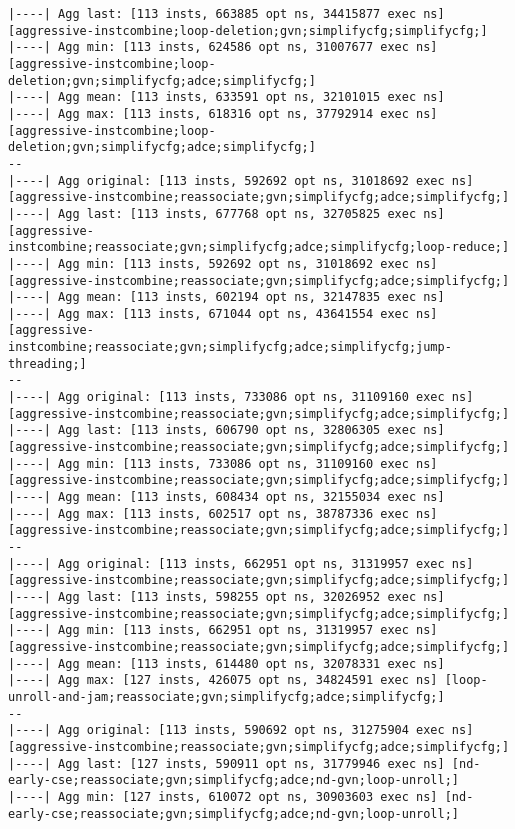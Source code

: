 \documentclass{vldb}
\begin{document}
\begin{lstlisting}[caption={Results of TPC-C Query with Expert Optimizations},label={lst:tpccexpertopt}]
|----| Agg last: [113 insts, 663885 opt ns, 34415877 exec ns] [aggressive-instcombine;loop-deletion;gvn;simplifycfg;simplifycfg;]
|----| Agg min: [113 insts, 624586 opt ns, 31007677 exec ns] [aggressive-instcombine;loop-deletion;gvn;simplifycfg;adce;simplifycfg;]
|----| Agg mean: [113 insts, 633591 opt ns, 32101015 exec ns]
|----| Agg max: [113 insts, 618316 opt ns, 37792914 exec ns] [aggressive-instcombine;loop-deletion;gvn;simplifycfg;adce;simplifycfg;]
--
|----| Agg original: [113 insts, 592692 opt ns, 31018692 exec ns] [aggressive-instcombine;reassociate;gvn;simplifycfg;adce;simplifycfg;]
|----| Agg last: [113 insts, 677768 opt ns, 32705825 exec ns] [aggressive-instcombine;reassociate;gvn;simplifycfg;adce;simplifycfg;loop-reduce;]
|----| Agg min: [113 insts, 592692 opt ns, 31018692 exec ns] [aggressive-instcombine;reassociate;gvn;simplifycfg;adce;simplifycfg;]
|----| Agg mean: [113 insts, 602194 opt ns, 32147835 exec ns]
|----| Agg max: [113 insts, 671044 opt ns, 43641554 exec ns] [aggressive-instcombine;reassociate;gvn;simplifycfg;adce;simplifycfg;jump-threading;]
--
|----| Agg original: [113 insts, 733086 opt ns, 31109160 exec ns] [aggressive-instcombine;reassociate;gvn;simplifycfg;adce;simplifycfg;]
|----| Agg last: [113 insts, 606790 opt ns, 32806305 exec ns] [aggressive-instcombine;reassociate;gvn;simplifycfg;adce;simplifycfg;]
|----| Agg min: [113 insts, 733086 opt ns, 31109160 exec ns] [aggressive-instcombine;reassociate;gvn;simplifycfg;adce;simplifycfg;]
|----| Agg mean: [113 insts, 608434 opt ns, 32155034 exec ns]
|----| Agg max: [113 insts, 602517 opt ns, 38787336 exec ns] [aggressive-instcombine;reassociate;gvn;simplifycfg;adce;simplifycfg;]
--
|----| Agg original: [113 insts, 662951 opt ns, 31319957 exec ns] [aggressive-instcombine;reassociate;gvn;simplifycfg;adce;simplifycfg;]
|----| Agg last: [113 insts, 598255 opt ns, 32026952 exec ns] [aggressive-instcombine;reassociate;gvn;simplifycfg;adce;simplifycfg;]
|----| Agg min: [113 insts, 662951 opt ns, 31319957 exec ns] [aggressive-instcombine;reassociate;gvn;simplifycfg;adce;simplifycfg;]
|----| Agg mean: [113 insts, 614480 opt ns, 32078331 exec ns]
|----| Agg max: [127 insts, 426075 opt ns, 34824591 exec ns] [loop-unroll-and-jam;reassociate;gvn;simplifycfg;adce;simplifycfg;]
--
|----| Agg original: [113 insts, 590692 opt ns, 31275904 exec ns] [aggressive-instcombine;reassociate;gvn;simplifycfg;adce;simplifycfg;]
|----| Agg last: [127 insts, 590911 opt ns, 31779946 exec ns] [nd-early-cse;reassociate;gvn;simplifycfg;adce;nd-gvn;loop-unroll;]
|----| Agg min: [127 insts, 610072 opt ns, 30903603 exec ns] [nd-early-cse;reassociate;gvn;simplifycfg;adce;nd-gvn;loop-unroll;]

\end{lstlisting}
\end{document}
